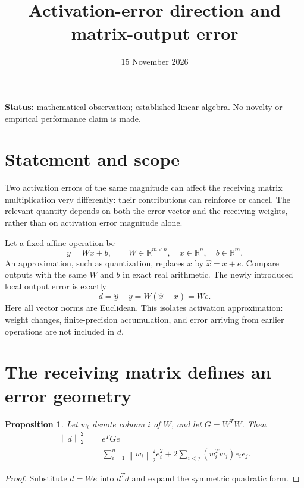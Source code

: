 \documentclass[10pt,a4paper]{article}
\title{Activation-error direction and matrix-output error}
\author{}
\date{15 November 2026}
\newcommand{\R}{\mathbb{R}}
\newcommand{\norm}[1]{\left\lVert #1\right\rVert}
\newtheorem{proposition}{Proposition}
\begin{document}
\maketitle
\noindent\textbf{Status:} mathematical observation; established linear algebra.
No novelty or empirical performance claim is made.

\section{Statement and scope}
Two activation errors of the same magnitude can affect the receiving matrix
multiplication very differently: their contributions can reinforce or cancel.
The relevant quantity depends on both the error vector and the receiving
weights, rather than on activation error magnitude alone.

Let a fixed affine operation be
\begin{equation}
  y=Wx+b,\qquad W\in\R^{m\times n},\quad x\in\R^n,\quad b\in\R^m.
  \label{aed:operation}
\end{equation}
An approximation, such as quantization, replaces $x$ by $\widehat{x}=x+e$.
Compare outputs with the same $W$ and $b$ in exact real arithmetic. The newly
introduced local output error is exactly
\begin{equation}
  d=\widehat{y}-y=W(\widehat{x}-x)=We.
  \label{aed:local-error}
\end{equation}
Here all vector norms are Euclidean. This isolates activation approximation:
weight changes, finite-precision accumulation, and error arriving from earlier
operations are not included in $d$.

\section{The receiving matrix defines an error geometry}
\begin{proposition}
Let $w_i$ denote column $i$ of $W$, and let $G=W^TW$. Then
\begin{align}
  \norm{d}_2^2
    &=e^TGe \label{aed:gram}\\
    &=\sum_{i=1}^n\norm{w_i}_2^2 e_i^2
      +2\sum_{i<j}(w_i^Tw_j)e_i e_j.
      \label{aed:cross-terms}
\end{align}
\end{proposition}
\begin{proof}
Substitute $d=We$ into $d^Td$ and expand the symmetric quadratic form.
\end{proof}
\end{document}
